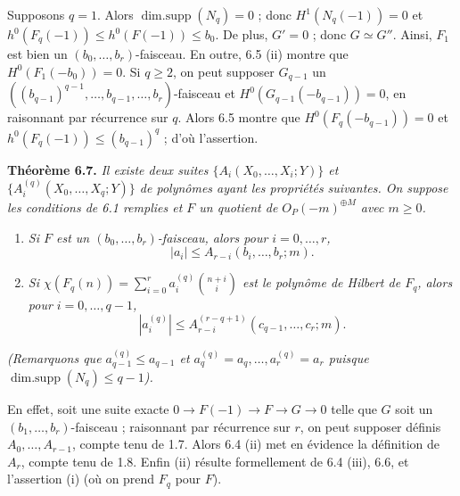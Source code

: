 

Supposons $q=1$. Alors $\operatorname{dim{.}supp}(N_q)=0$ ; donc $H^1(N_q(-1))=0$ et $h^0(F_q(-1))\le h^0(F(-1))\le b_0$. De plus, $G'=0$ ; donc $G\simeq G''$. Ainsi, $F_1$ est bien un $(b_0,\ldots,b_r)$-faisceau. En outre, 6.5 (ii) montre que $H^0(F_1(-b_0))=0$. Si $q\ge2$, on peut supposer $G_{q-1}$ un $((b_{q-1})^{q-1},\ldots,b_{q-1},\ldots,b_r)$-faisceau et $H^0(G_{q-1}(-b_{q-1}))=0$, en raisonnant par r\'ecurrence sur $q$. Alors 6.5 montre que $H^0(F_q(-b_{q-1}))=0$ et $h^0(F_q(-1))\le (b_{q-1})^q$ ; d'o\`u l'assertion.

\textbf{Th\'eor\`eme 6.7.} \emph{Il existe deux suites $\{A_i(X_0,\ldots,X_i;Y)\}$ et $\{A_i^{(q)}(X_0,\ldots,X_q;Y)\}$ de polyn\^omes ayant les propri\'et\'es suivantes. On suppose les conditions de 6.1 remplies et $F$ un quotient de ${O}_P(-m)^{\oplus M}$ avec $m\ge0$.}
\begin{enumerate}[label=(\roman*)]
\item \emph{Si $F$ est un $(b_0,\ldots,b_r)$-faisceau, alors pour $i=0,\ldots,r$,}
\[
   |a_i|\le A_{r-i}(b_i,\ldots,b_r;m).
\]
\item \emph{Si $\chi(F_q(n))=\sum_{i=0}^{r} a_i^{(q)}\binom{n+i}{i}$ est le polyn\^ome de Hilbert de $F_q$, alors pour $i=0,\ldots,q-1$,}
\[
   |a_i^{(q)}|\le A_{r-i}^{(r-q+1)}(c_{q-1},\ldots,c_r;m).
\]
\end{enumerate}
\emph{(Remarquons que $a_{q-1}^{(q)}\le a_{q-1}$ et $a_q^{(q)}=a_q,\ldots,a_r^{(q)}=a_r$ puisque $\operatorname{dim{.}supp}(N_q)\le q-1$).}

En effet, soit une suite exacte $0\to F(-1)\to F\to G\to0$ telle que $G$ soit un $(b_1,\ldots,b_r)$-faisceau ; raisonnant par r\'ecurrence sur $r$, on peut supposer d\'efinis $A_0,\ldots,A_{r-1}$, compte tenu de 1.7. Alors 6.4 (ii) met en \'evidence la d\'efinition de $A_r$, compte tenu de 1.8. Enfin (ii) r\'esulte formellement de 6.4 (iii), 6.6, et l'assertion (i) (o\`u on prend $F_q$ pour $F$).

